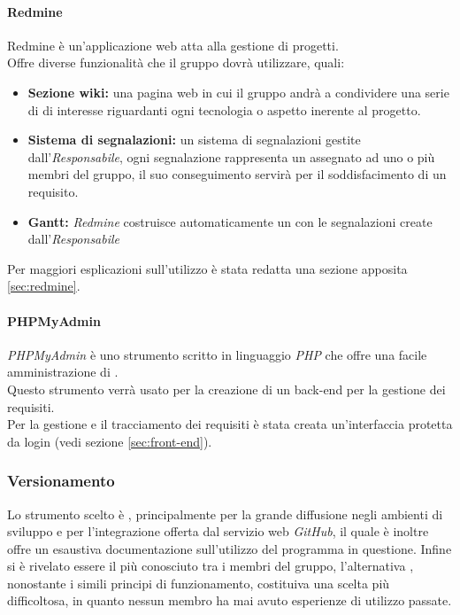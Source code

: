 \documentclass{scalatekids-article}
\begin{document}
\paragraph{Redmine}

Redmine è un'applicazione web atta alla gestione di progetti.\\
Offre diverse funzionalità che il gruppo dovrà utilizzare, quali:
\begin{itemize}
    \item\textbf{Sezione wiki:} una pagina web in cui il gruppo andrà a condividere una serie di  di interesse riguardanti ogni tecnologia o aspetto inerente al progetto.
    \item\textbf{Sistema di segnalazioni:} un sistema di segnalazioni gestite dall'\textit{Responsabile}, ogni segnalazione rappresenta un  assegnato ad uno o più membri del gruppo, il suo conseguimento servirà per il soddisfacimento di un requisito.
    \item\textbf{Gantt:} \textit{Redmine} costruisce automaticamente un  con le segnalazioni create dall'\textit{Responsabile}
\end{itemize}
Per maggiori esplicazioni sull'utilizzo è stata redatta una sezione apposita \ref{sec:redmine}.

\paragraph{PHPMyAdmin}

\textit{PHPMyAdmin} è uno strumento scritto in linguaggio \textit{PHP} che offre una facile amministrazione di \textit{}.\\
Questo strumento verrà usato per la creazione di un back-end per la gestione dei requisiti.\\
Per la gestione e il tracciamento dei requisiti è stata creata un'interfaccia protetta da login (vedi sezione \ref{sec:front-end}).

\subsubsection{Versionamento}

Lo strumento scelto è , principalmente per la grande diffusione negli
ambienti di sviluppo e per l'integrazione offerta dal servizio web
\textit{GitHub}, il quale è inoltre offre un esaustiva documentazione
sull'utilizzo del programma in questione. Infine  si è rivelato essere
il più conosciuto tra i membri del gruppo, l'alternativa , nonostante
i simili principi di funzionamento, costituiva una scelta più difficoltosa, in
quanto nessun membro ha mai avuto esperienze di utilizzo passate.
\end{document}

